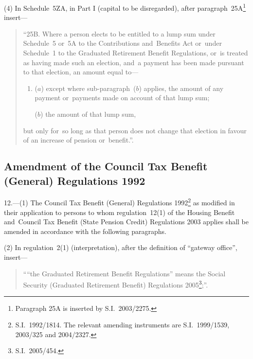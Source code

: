 \documentclass[12pt,a4paper]{article}
\begin{document}
(4) In Schedule~5ZA, in Part I (capital to be disregarded), after paragraph~25A\footnote{Paragraph 25A is inserted by S.I.~2003/2275.} insert—
\begin{quotation}
“25B.  Where a person elects to be entitled to a lump sum under Schedule~5 or~5A to the Contributions and~Benefits Act or~under Schedule~1 to the Graduated Retirement Benefit Regulations, or~is treated as having made such an election, and~a payment has been made pursuant to that election, an amount equal to—
\begin{enumerate}\item[]
($a$) except where sub-paragraph~($b$)  applies, the amount of any payment or~payments made on account of that lump sum;

($b$) the amount of that lump sum,
\end{enumerate}
but only for~so long as that person does not change that election in favour of an increase of pension or~benefit.”.
\end{quotation}

\subsection[12. Amendment of the Council Tax Benefit (General) Regulations 1992]{Amendment of the Council Tax Benefit (General) Regulations 1992}

12.---(1)  The Council Tax Benefit (General) Regulations 1992\footnote{S.I.~1992/1814. The relevant amending instruments are S.I.~1999/1539, 2003/325 and 2004/2327.} as modified in their application to persons to whom regulation~12(1) of the Housing Benefit and~Council Tax Benefit (State Pension Credit) Regulations 2003 applies shall be amended in accordance with the following paragraphs.

(2) In regulation~2(1) (interpretation), after the definition of “gateway office”, insert—
\begin{quotation}\sloppy
““the Graduated Retirement Benefit Regulations” means the Social Security (Graduated Retirement Benefit) Regulations 2005\footnote{S.I.~2005/454.};”.
\end{quotation}
\end{document}
